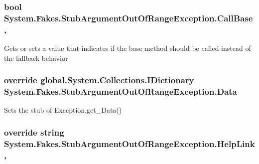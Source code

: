 \hypertarget{class_system_1_1_fakes_1_1_stub_argument_out_of_range_exception_a1c60bb0778e78ad9fe813b497a11c24f}{
\subsubsection[{Call\-Base}]{\setlength{\rightskip}{0pt plus 5cm}bool System.\-Fakes.\-Stub\-Argument\-Out\-Of\-Range\-Exception.\-Call\-Base\hspace{0.3cm}{\ttfamily [get]}, {\ttfamily [set]}}}\label{class_system_1_1_fakes_1_1_stub_argument_out_of_range_exception_a1c60bb0778e78ad9fe813b497a11c24f}


Gets or sets a value that indicates if the base method should be called instead of the fallback behavior

\hypertarget{class_system_1_1_fakes_1_1_stub_argument_out_of_range_exception_ae234c1659a84d86f484f638460c58a7e}{
\subsubsection[{Data}]{\setlength{\rightskip}{0pt plus 5cm}override global.\-System.\-Collections.\-I\-Dictionary System.\-Fakes.\-Stub\-Argument\-Out\-Of\-Range\-Exception.\-Data\hspace{0.3cm}{\ttfamily [get]}}}\label{class_system_1_1_fakes_1_1_stub_argument_out_of_range_exception_ae234c1659a84d86f484f638460c58a7e}


Sets the stub of Exception.\-get\-\_\-\-Data()

\hypertarget{class_system_1_1_fakes_1_1_stub_argument_out_of_range_exception_ac375923652844bc844f031e8cb569de3}{
\subsubsection[{Help\-Link}]{\setlength{\rightskip}{0pt plus 5cm}override string System.\-Fakes.\-Stub\-Argument\-Out\-Of\-Range\-Exception.\-Help\-Link\hspace{0.3cm}{\ttfamily [get]}, {\ttfamily [set]}}}\label{class_system_1_1_fakes_1_1_stub_argument_out_of_range_exception_ac375923652844bc844f031e8cb569de3}


